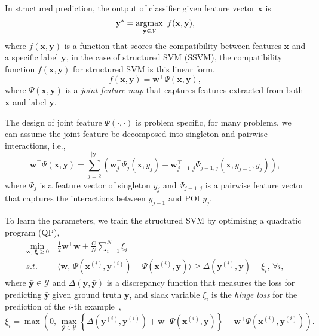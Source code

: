 In structured prediction, the output of classifier given feature vector $\mathbf{x}$ is
\begin{equation*}
\mathbf{y}^* = \operatorname*{argmax}_{\mathbf{y} \in \mathcal{Y}}~ f(\mathbf{x}, \mathbf{y}),
\end{equation*}
where $f(\mathbf{x}, \mathbf{y})$ is a function that scores the compatibility between features $\mathbf{x}$ and a specific label $\mathbf{y}$,
in the case of structured SVM (SSVM), the compatibility function $f(\mathbf{x}, \mathbf{y})$ for structured SVM is this linear form,
\begin{equation*}
f(\mathbf{x}, \mathbf{y}) = \mathbf{w}^\top \Psi(\mathbf{x}, \mathbf{y}),
\end{equation*}
where $\Psi(\mathbf{x}, \mathbf{y})$ is a \emph{joint feature map} 
that captures features extracted from both $\mathbf{x}$ and label $\mathbf{y}$.

The design of joint feature $\Psi(\cdot,\cdot)$ is problem specific, 
for many problems, we can assume the joint feature be decomposed into singleton and pairwise interactions, i.e.,
\begin{equation*}
\label{eq:jointfeature}
\mathbf{w}^\top \Psi(\mathbf{x}, \mathbf{y}) 
= \sum_{j=2}^{| \mathbf{y} |} 
  \left( \mathbf{w}_j^\top \Psi_j(\mathbf{x}, y_j) + 
  \mathbf{w}_{j-1,j}^\top \Psi_{j-1, j}(\mathbf{x}, y_{j-1}, y_j) \right),
\end{equation*}
where $\Psi_j$ is a feature vector of singleton $y_j$ 
and $\Psi_{j-1,j}$ is a pairwise feature vector that captures the interactions between $y_{j-1}$ and POI $y_j$.

To learn the parameters, we train the structured SVM by optimising a quadratic program (QP),
\begin{equation}
\label{eq:nslack}
\begin{aligned}
\min_{\mathbf{w}, \, \bm{\xi} \ge 0} ~& \frac{1}{2} \mathbf{w}^\top \mathbf{w} + \frac{C}{N} \sum_{i=1}^N \xi_i \\
s.t.~ ~& \langle \mathbf{w}, \, \Psi(\mathbf{x}^{(i)}, \mathbf{y}^{(i)}) - \Psi(\mathbf{x}^{(i)}, \bar{\mathbf{y}}) \rangle \ge 
       \Delta(\mathbf{y}^{(i)}, \bar{\mathbf{y}}) - \xi_i, \, \forall i,
\end{aligned}
\end{equation}
where $\bar{\mathbf{y}} \in \mathcal{Y}$ and $\Delta(\mathbf{y}, \bar{\mathbf{y}})$ is a discrepancy function that measures the loss 
for predicting $\bar{\mathbf{y}}$ given ground truth $\mathbf{y}$, 
and slack variable $\xi_i$ is the \emph{hinge loss} for the prediction of the $i$-th example~\cite{tsochantaridis2005large},
\begin{equation*}
\xi_i = \max \left( 0, \,
        \max_{\bar{\mathbf{y}} \in \mathcal{Y}} 
        \left\{ \Delta(\mathbf{y}^{(i)}, \bar{\mathbf{y}}^{(i)}) + \mathbf{w}^\top \Psi(\mathbf{x}^{(i)}, \bar{\mathbf{y}}) \right\} -
        \mathbf{w}^\top \Psi(\mathbf{x}^{(i)}, \mathbf{y}^{(i)}) \right).
\end{equation*}

